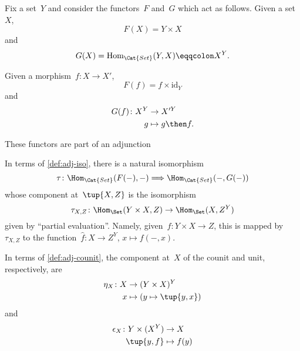 Fix a set~$Y$ and consider the functors~$F$ and~$G$ which act as follows. Given a set~$X$,
\begin{equation*}
  F(X) = Y \times X
\end{equation*}
and
\begin{equation*}
  G(X) = \text{Hom}_{\Cat{Set}}(Y, X) \eqqcolon X^Y.
\end{equation*}

Given a morphism~$f\colon X \to X'$,
\begin{equation*}
  F(f) = f \times \text{id}_Y
\end{equation*}
and
\begin{equation*}
  \begin{aligned}
    G(f)\colon X^Y &\to X'^Y\\
    g &\mapsto g \then f.
  \end{aligned}
\end{equation*}

These functors are part of an adjunction

\begin{center}
\end{center}
In terms of \cref{def:adj-iso}, there is a natural isomorphism
\begin{equation*}
  \tau\colon \Hom_{\Cat{Set}}(F(- ), - )  \Longrightarrow  \Hom_{\Cat{Set}}(- , G( - ))
\end{equation*}
whose component at~$\tup{X,Z}$ is the isomorphism
\begin{equation*}
  \tau_{X,Z} \colon \Hom_{\Set}(Y \times X, Z) \to \Hom_{\Set}(X, Z^Y)
\end{equation*}
given by ``partial evaluation''. Namely, given~$f\colon Y \times X \to Z$,  this is mapped by~$\tau_{X,Z}$ to the function~$\hat f\colon X \to Z^Y$, $x \mapsto f( -, x)$.

In terms of \cref{def:adj-counit}, the component at~$X$ of the counit and unit, respectively, are
\begin{equation*}
  \begin{aligned}
    \eta_X \colon X &\to  (Y \times X)^Y\\
    x &\mapsto (y \mapsto \tup{y,x})
  \end{aligned}
\end{equation*}
and
\begin{equation*}
  \begin{aligned}
    \epsilon_X \colon Y \times (X^Y) &\to X\\
    \tup{y,f} &\mapsto f(y)
  \end{aligned}
\end{equation*}


